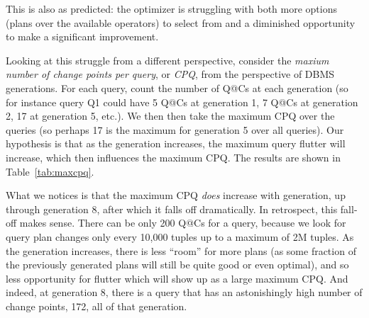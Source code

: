 \documentclass[prodmode,acmtods]{acmsmall}
\begin{document}
This is also as predicted: the optimizer is struggling with both more
options (plans over the available operators) to select from and a diminished
opportunity to make a significant improvement.

Looking at this struggle from a different perspective, consider the {\em
  maxium number of change points per query}, or {\em CPQ}, from the perspective of
\hbox{DBMS} generations. For each query, count the number of Q@Cs at each
generation (so for instance query Q1 could have 5 Q@Cs at generation 1, 7 Q@Cs at
generation 2, 17 at generation 5, etc.). We then then take the maximum CPQ
over the queries (so perhaps 17 is the maximum for generation 5 over all
queries). Our hypothesis is  that as the generation increases, the maximum
query flutter will increase, which then influences the maximum CPQ. The results are shown in Table~\ref{tab:maxcpq}.

\begin{table}
[t]
\end{table}

What we notices is that the maximum CPQ {\em does} increase with generation,
up through generation 8, after which it falls off dramatically. In
retrospect, this fall-off makes sense. There can be only 200 Q@Cs for a
query, because we look for query plan changes only every 10,000 tuples up to
a maximum of 2M tuples. As the generation increases, there is less ``room''
for more plans (as some fraction of the previously generated plans will
still be quite good or even optimal), and so less opportunity for flutter
which will show up as a large maximum CPQ. And indeed, at generation 8,
there is a query that has an astonishingly high number of change points,
172, all of that generation.
\end{document}

